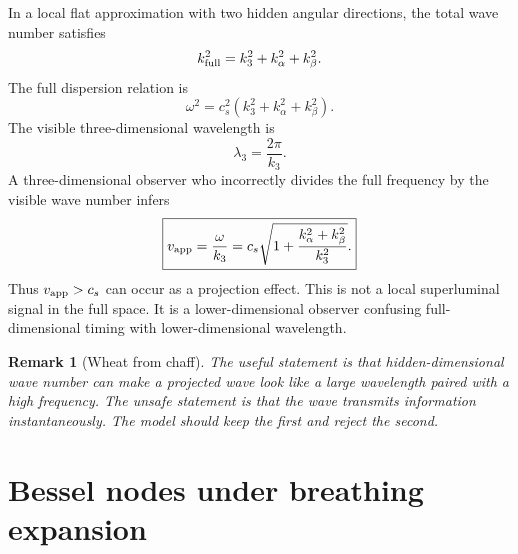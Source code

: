 \documentclass[11pt]{article}
\newtheorem{remark}{Remark}
\begin{document}
In a local flat approximation with two hidden angular directions, the total wave number satisfies
\begin{equation}
 k_{\rm full}^2=k_3^2+k_\alpha^2+k_\beta^2.
\end{equation}
The full dispersion relation is
\begin{equation}
 \omega^2=c_s^2\left(k_3^2+k_\alpha^2+k_\beta^2\right).
 \label{eq:hidden-dispersion}
\end{equation}
The visible three-dimensional wavelength is
\begin{equation}
 \lambda_3=\frac{2\pi}{k_3}.
\end{equation}
A three-dimensional observer who incorrectly divides the full frequency by the visible wave number infers
\begin{equation}
 \boxed{
 v_{\rm app}=\frac{\omega}{k_3}
 =c_s\sqrt{1+\frac{k_\alpha^2+k_\beta^2}{k_3^2}}.
 }
 \label{eq:apparent-phase-speed}
\end{equation}
Thus $v_{\rm app}>c_s$ can occur as a projection effect.  This is not a local superluminal signal in the full space.  It is a lower-dimensional observer confusing full-dimensional timing with lower-dimensional wavelength.

\begin{remark}[Wheat from chaff]
The useful statement is that hidden-dimensional wave number can make a projected wave look like a large wavelength paired with a high frequency.  The unsafe statement is that the wave transmits information instantaneously.  The model should keep the first and reject the second.
\end{remark}

\section{Bessel nodes under breathing expansion}
\end{document}
